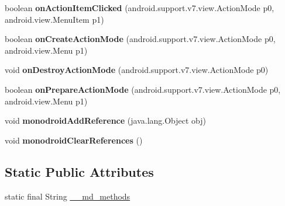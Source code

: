 \begin{DoxyCompactItemize}
\item 
\mbox{\label{classmd5b60ffeb829f638581ab2bb9b1a7f4f3f_1_1_cell_adapter_a49e5cfeb93c21213d2f7962e65898a5e}} 
boolean {\bfseries on\+Action\+Item\+Clicked} (android.\+support.\+v7.\+view.\+Action\+Mode p0, android.\+view.\+Menu\+Item p1)
\item 
\mbox{\label{classmd5b60ffeb829f638581ab2bb9b1a7f4f3f_1_1_cell_adapter_af5577bc64f0be210f22a89792a8be639}} 
boolean {\bfseries on\+Create\+Action\+Mode} (android.\+support.\+v7.\+view.\+Action\+Mode p0, android.\+view.\+Menu p1)
\item 
\mbox{\label{classmd5b60ffeb829f638581ab2bb9b1a7f4f3f_1_1_cell_adapter_a8d6a0075be883243c54327d203a8d575}} 
void {\bfseries on\+Destroy\+Action\+Mode} (android.\+support.\+v7.\+view.\+Action\+Mode p0)
\item 
\mbox{\label{classmd5b60ffeb829f638581ab2bb9b1a7f4f3f_1_1_cell_adapter_aba7bba2fe00d346e064e9ff1f742296f}} 
boolean {\bfseries on\+Prepare\+Action\+Mode} (android.\+support.\+v7.\+view.\+Action\+Mode p0, android.\+view.\+Menu p1)
\item 
\mbox{\label{classmd5b60ffeb829f638581ab2bb9b1a7f4f3f_1_1_cell_adapter_a59b12b00e8c034309892498bbef078d4}} 
void {\bfseries monodroid\+Add\+Reference} (java.\+lang.\+Object obj)
\item 
\mbox{\label{classmd5b60ffeb829f638581ab2bb9b1a7f4f3f_1_1_cell_adapter_aad3dc816719d492f2fa5de60860e45e7}} 
void {\bfseries monodroid\+Clear\+References} ()
\end{DoxyCompactItemize}
\subsection*{Static Public Attributes}
\begin{DoxyCompactItemize}
\item 
static final String \hyperlink{classmd5b60ffeb829f638581ab2bb9b1a7f4f3f_1_1_cell_adapter_abe33e45a7b887b1383f9c0ebda43ef00}{\+\_\+\+\_\+md\+\_\+methods}
\end{DoxyCompactItemize}


